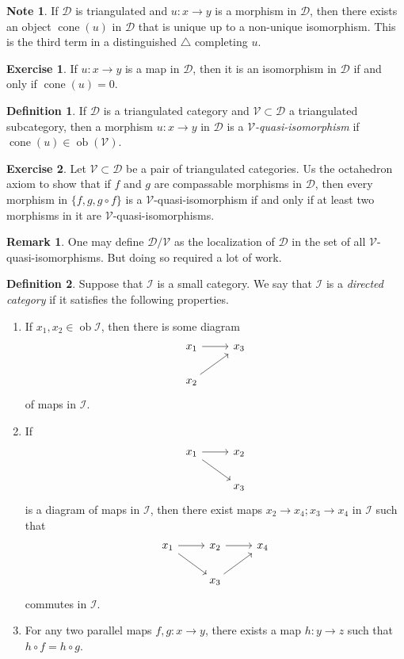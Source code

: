 \documentclass[10pt,letterpaper,cm]{nupset}
\theoremstyle{definition}
\newtheorem*{definition}{Definition}
\newtheorem{note}{Note}
\newtheorem{remark}{Remark}
\newtheorem{exercise}{Exercise}
\newcommand{\1}{\mathbf{1}}
\renewcommand{\d}{\mathscr{D}}
\renewcommand{\i}{\mathscr{I}}
\renewcommand{\v}{\mathscr{V}}
\newcommand{\0}{\vec 0}
\DeclareMathOperator{\ob}{ob}
\DeclareMathOperator{\cone}{cone}
\begin{document}
\begin{note}
 If $\d$ is triangulated and $u: x \to y$ is a morphism in $\d$, then there exists an object $\cone(u)$ in $\d$ that is unique up to a non-unique isomorphism. This is the third term in a distinguished $\triangle$ completing $u$. 
\end{note}

\begin{exercise}
If $u : x \to y$ is a map in $\d$, then it is an isomorphism in $\d$ if and only if $\cone(u) =0$. 
\end{exercise}

\begin{definition}
If $\d$ is a triangulated category and $\v\subset \d$ a triangulated subcategory, then a morphism $u : x \to y$ in $\d$ is a \textit{$\v$-quasi-isomorphism} if $\cone(u) \in \ob(\v)$.
\end{definition}

\begin{exercise}
Let $\v \subset \d$ be a pair of triangulated categories. Us the octahedron axiom to show that if $f$ and $g$ are compassable morphisms in $\d$, then every morphism in $\{f, g, g \circ f\}$ is a $\v$-quasi-isomorphism if and only if at least two morphisms in it are $\v$-quasi-isomorphisms. 
\end{exercise}

\begin{remark}
One may define $\d/\v$ as the localization of $\d$ in the set of all $\v$-quasi-isomorphisms. But doing so required a lot of work. 
\end{remark}

\begin{definition}
Suppose that $\i$ is a small category. We say that $\i$ is a \textit{directed category} if it satisfies the following properties.
\begin{enumerate}
\item If $x_1, x_2 \in \ob{\i}$, then there is some diagram 
\[
\begin{tikzcd}
x_1 \arrow[r]  & x_3 \\
x_2 \arrow[ru] &    
\end{tikzcd}
\] of maps in $\i$.
\item If 
\[
\begin{tikzcd}
x_1 \arrow[r] \arrow[rd] & x_2 \\
                         & x_3
\end{tikzcd}
\] is a diagram of maps in $\i$, then there exist maps $x_2 \to x_4; x_3 \to x_4$ in $\i$ such that 
\[
\begin{tikzcd}
x_1 \arrow[r] \arrow[rd] & x_2 \arrow[r]  & x_4 \\
                         & x_3 \arrow[ru] &    
\end{tikzcd}
\] commutes in $\i$.
\item For any two parallel maps $f,g : x \to y$, there exists a map $h: y \to z$ such that $h \circ f = h \circ g$. 
\end{enumerate}
\end{definition}
\end{document}
